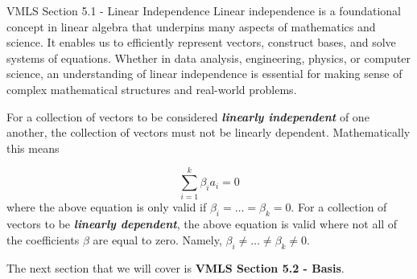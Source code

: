 \begin{notes}{VMLS Section 5.1 - Linear Independence}
    Linear independence is a foundational concept in linear algebra that underpins many aspects of mathematics and science. It enables us to efficiently represent vectors, construct bases, and solve 
    systems of equations. Whether in data analysis, engineering, physics, or computer science, an understanding of linear independence is essential for making sense of complex mathematical structures 
    and real-world problems.

    \begin{highlight}
        For a collection of vectors to be considered \textit{\textbf{linearly independent}} of one another, the collection of vectors must not be linearly dependent. Mathematically this means

        \begin{equation*}
            \sum_{i = 1}^{k} \beta_{i}a_{i} = 0
        \end{equation*}
        where the above equation is only valid if $\beta_{i} = \dots = \beta_{k} = 0$. For a collection of vectors to be \textit{\textbf{linearly dependent}}, the above equation is valid where not all
        of the coefficients $\beta$ are equal to zero. Namely, $\beta_{i} \neq \dots \neq \beta_{k} \neq 0$.
    \end{highlight}
\end{notes}

The next section that we will cover is \textbf{VMLS Section 5.2 - Basis}.


